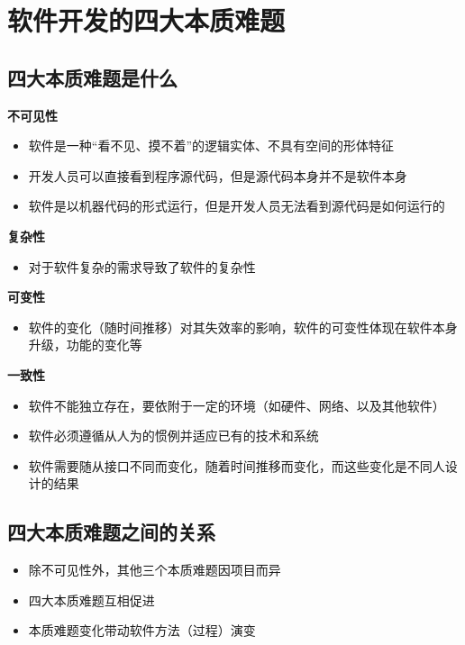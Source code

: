 \section{软件开发的四大本质难题}

\subsection{四大本质难题是什么}
\textbf{不可见性}
\begin{itemize}
    \item 软件是一种“看不见、摸不着”的逻辑实体、不具有空间的形体特征
    \item 开发人员可以直接看到程序源代码，但是源代码本身并不是软件本身
    \item 软件是以机器代码的形式运行，但是开发人员无法看到源代码是如何运行的
\end{itemize}

\textbf{复杂性}
\begin{itemize}
    \item 对于软件复杂的需求导致了软件的复杂性
\end{itemize}

\textbf{可变性}
\begin{itemize}
    \item 软件的变化（随时间推移）对其失效率的影响，软件的可变性体现在软件本身升级，功能的变化等
\end{itemize}

\textbf{一致性}
\begin{itemize}
    \item 软件不能独立存在，要依附于一定的环境（如硬件、网络、以及其他软件）
    \item 软件必须遵循从人为的惯例并适应已有的技术和系统
    \item 软件需要随从接口不同而变化，随着时间推移而变化，而这些变化是不同人设计的结果
\end{itemize}


\subsection{四大本质难题之间的关系}
\vspace{-0.8em}
\begin{multicols}{2}
    \begin{itemize}
        \item 除不可见性外，其他三个本质难题因项目而异
        \item 四大本质难题互相促进
        \item 本质难题变化带动软件方法（过程）演变
    \end{itemize}
\end{multicols}
\vspace{-1em}


